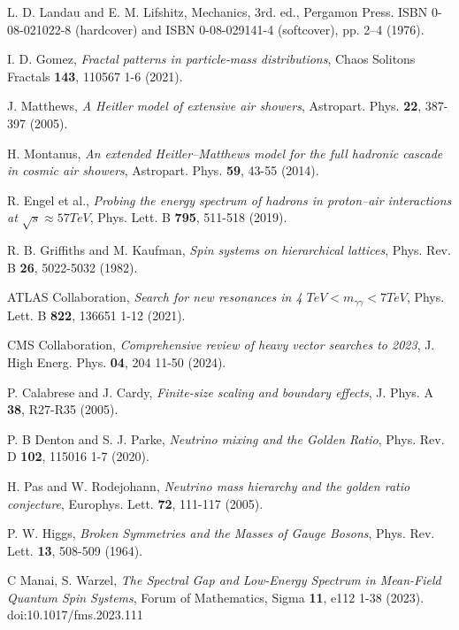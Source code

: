 \documentclass[%
  amsmath,amssymb,
  aps,
 prb,
 floatfix, showkeys
 ]{revtex4-2}
\begin{document}
\begin{thebibliography}{99}
   L. D. Landau and E. M. Lifshitz,  Mechanics, 3rd. ed., Pergamon Press.
   ISBN 0-08-021022-8 (hardcover) and ISBN 0-08-029141-4 (softcover), pp. 2–4 (1976).
   
   I. D. Gomez, {\it Fractal patterns in particle‐mass distributions},
   Chaos Solitons Fractals {\bf 143}, 110567 1-6 (2021).
 
   J. Matthews, {\it A Heitler model of extensive air showers}, Astropart. Phys.
   {\bf 22},  387-397 (2005).
 
   H. Montanus, {\it An extended Heitler–Matthews model for the full hadronic cascade in cosmic air showers},
   Astropart. Phys. {\bf 59},  43-55 (2014).
   
   R. Engel et al., {\it Probing the energy spectrum of hadrons in proton–air interactions at
     $\sqrt{s} \approx 57 TeV$},  Phys. Lett. B {\bf 795},  511-518 (2019).
 
   R. B. Griffiths and M. Kaufman, {\it Spin systems on hierarchical lattices},
   Phys. Rev. B {\bf 26}, 5022-5032 (1982).
 
   ATLAS Collaboration, {\it Search for new resonances in 4 $TeV < m_{\gamma \gamma} < 7 TeV$},
   Phys. Lett. B  {\bf 822},  136651 1-12 (2021).
 
   CMS Collaboration, {\it Comprehensive review of heavy vector searches to 2023},
    J. High Energ. Phys. {\bf 04}, 204 11-50 (2024).
   
   P. Calabrese  and  J. Cardy, {\it Finite-size scaling and boundary effects},
   J. Phys. A  {\bf 38}, R27-R35 (2005).
 
   P. B Denton  and  S. J. Parke, {\it Neutrino mixing and the Golden Ratio},
   Phys. Rev. D {\bf 102}, 115016 1-7 (2020).
 
   H. Pas and W. Rodejohann, {\it Neutrino mass hierarchy and the golden ratio conjecture},
   Europhys. Lett. {\bf 72}, 111-117 (2005).
 
  P. W. Higgs, {\it Broken Symmetries and the Masses of Gauge Bosons},
   Phys. Rev. Lett. {\bf 13}, 508-509 (1964).
   
    C Manai, S. Warzel,
    {\it  The Spectral Gap and Low-Energy Spectrum in Mean-Field Quantum Spin Systems}, 
      Forum of Mathematics, Sigma {\bf 11}, e112 1-38 (2023). doi:10.1017/fms.2023.111 
 

\end{thebibliography}
\end{document}
